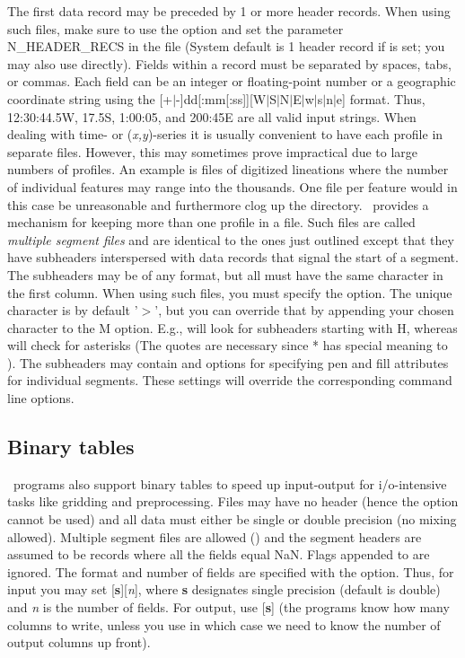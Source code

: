 The first data record may be preceded by 1 or more header records.
When using such files, make sure to use the  option and set
the parameter N\_HEADER\_RECS in the  file
(System default is 1 header record if  is set; you may also
use  directly).  Fields
within a record must be separated by spaces, tabs, or commas.
Each field can be an integer or floating-point number or a geographic
coordinate string using the [+$|$-]dd[:mm[:ss]][W$|$S$|$N$|$E$|$w$|$s$|$n$|$e] format.
Thus, 12:30:44.5W, 17.5S, 1:00:05, and 200:45E are all valid input strings.
When dealing with time- or ({\it x,y})-series it is usually
convenient to have each profile in separate files.
However, this may sometimes prove impractical due to large numbers
of profiles.  An example is files of digitized lineations where
the number of individual features may range into the thousands.
One file per feature would in this case be unreasonable and
furthermore clog up the directory. \GMT\ provides a mechanism for
keeping more than one profile in a file.  Such files are called
\emph{multiple segment files} and are identical to the ones
just outlined except that they have subheaders interspersed with
data records that signal the start of a segment.
The subheaders may be of any format, but all must have the same
character in the first column.  When using such files, you must
specify the  option.  The unique character is by default
'$>$', but you can override that by appending your chosen character
to the M option.  E.g.,  will look for subheaders starting
with H, whereas  will check for asterisks (The quotes
are necessary since * has special meaning to \UNIX).  The subheaders
may contain  and  options for specifying pen and
fill attributes for individual segments.  These settings will override
the corresponding command line options.

\subsection{Binary tables}

\GMT\ programs also support binary tables to speed up input-output
for i/o-intensive tasks like gridding and preprocessing.  Files
may have no header (hence the  option cannot be used)
and all data must either be single or double precision (no mixing
allowed).  Multiple segment files are allowed () and the
segment headers are assumed to be records where all the fields equal 
NaN.  Flags appended to  are ignored.  The format and number
of fields are specified with the
 option.  Thus, for input you may set [{\bf s}][{\it n}],
where {\bf s} designates single precision (default is double) and
{\it n} is the number of fields.  For output, use [{\bf s}] 
(the programs know how many columns to write, unless you use  in which
case we need to know the number of output columns up front).

